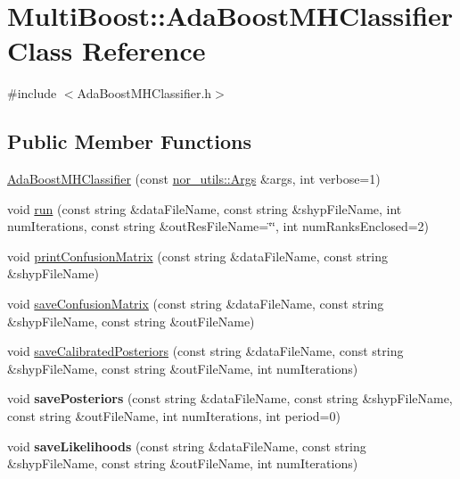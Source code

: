 \hypertarget{classMultiBoost_1_1AdaBoostMHClassifier}{\section{Multi\-Boost\-:\-:Ada\-Boost\-M\-H\-Classifier Class Reference}
\label{classMultiBoost_1_1AdaBoostMHClassifier}
}


{\ttfamily \#include $<$Ada\-Boost\-M\-H\-Classifier.\-h$>$}

\subsection*{Public Member Functions}
\begin{DoxyCompactItemize}
\item 
\hyperlink{classMultiBoost_1_1AdaBoostMHClassifier_a31fa77b75373125fd341e78689c58a99}{Ada\-Boost\-M\-H\-Classifier} (const \hyperlink{classnor__utils_1_1Args}{nor\-\_\-utils\-::\-Args} \&args, int verbose=1)
\item 
void \hyperlink{classMultiBoost_1_1AdaBoostMHClassifier_ad057ad026b06da56a17267725506a36c}{run} (const string \&data\-File\-Name, const string \&shyp\-File\-Name, int num\-Iterations, const string \&out\-Res\-File\-Name=\char`\"{}\char`\"{}, int num\-Ranks\-Enclosed=2)
\item 
void \hyperlink{classMultiBoost_1_1AdaBoostMHClassifier_aab2e6ac3ebcbffcd858111f08f22a844}{print\-Confusion\-Matrix} (const string \&data\-File\-Name, const string \&shyp\-File\-Name)
\item 
void \hyperlink{classMultiBoost_1_1AdaBoostMHClassifier_ada2d25b5a330993290a4fa97b2a52b43}{save\-Confusion\-Matrix} (const string \&data\-File\-Name, const string \&shyp\-File\-Name, const string \&out\-File\-Name)
\item 
void \hyperlink{classMultiBoost_1_1AdaBoostMHClassifier_ab25a3086b4915300c1e56f22b0e30c13}{save\-Calibrated\-Posteriors} (const string \&data\-File\-Name, const string \&shyp\-File\-Name, const string \&out\-File\-Name, int num\-Iterations)
\item 
\hypertarget{classMultiBoost_1_1AdaBoostMHClassifier_a0794865bea153fa56836d01f1eaae342}{void {\bfseries save\-Posteriors} (const string \&data\-File\-Name, const string \&shyp\-File\-Name, const string \&out\-File\-Name, int num\-Iterations, int period=0)}\label{classMultiBoost_1_1AdaBoostMHClassifier_a0794865bea153fa56836d01f1eaae342}

\item 
\hypertarget{classMultiBoost_1_1AdaBoostMHClassifier_ac741794a51c9607d1a91725eab7b16ac}{void {\bfseries save\-Likelihoods} (const string \&data\-File\-Name, const string \&shyp\-File\-Name, const string \&out\-File\-Name, int num\-Iterations)}\label{classMultiBoost_1_1AdaBoostMHClassifier_ac741794a51c9607d1a91725eab7b16ac}

\end{DoxyCompactItemize}
